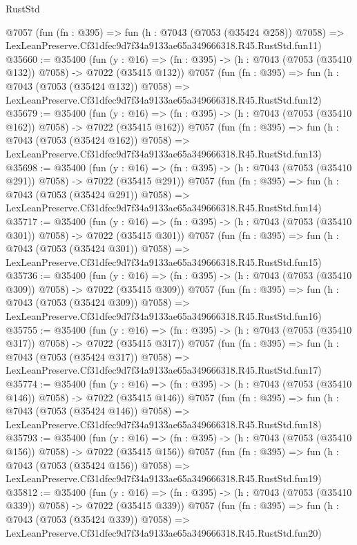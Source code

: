 \begin{lexlean}{RustStd}
\begin{coremodule}
    @7057
    (fun (fn : @395) =>
    fun (h : @7043 (@7053 (@35424 @258)) @7058) =>
    LexLeanPreserve.Cf31dfec9d7f34a9133ae65a349666318.R45.RustStd.fun11)
@35660 := @35400
    (fun (y : @16) => (fn : @395) -> (h : @7043 (@7053 (@35410 @132)) @7058) -> @7022 (@35415 @132))
    @7057
    (fun (fn : @395) =>
    fun (h : @7043 (@7053 (@35424 @132)) @7058) =>
    LexLeanPreserve.Cf31dfec9d7f34a9133ae65a349666318.R45.RustStd.fun12)
@35679 := @35400
    (fun (y : @16) => (fn : @395) -> (h : @7043 (@7053 (@35410 @162)) @7058) -> @7022 (@35415 @162))
    @7057
    (fun (fn : @395) =>
    fun (h : @7043 (@7053 (@35424 @162)) @7058) =>
    LexLeanPreserve.Cf31dfec9d7f34a9133ae65a349666318.R45.RustStd.fun13)
@35698 := @35400
    (fun (y : @16) => (fn : @395) -> (h : @7043 (@7053 (@35410 @291)) @7058) -> @7022 (@35415 @291))
    @7057
    (fun (fn : @395) =>
    fun (h : @7043 (@7053 (@35424 @291)) @7058) =>
    LexLeanPreserve.Cf31dfec9d7f34a9133ae65a349666318.R45.RustStd.fun14)
@35717 := @35400
    (fun (y : @16) => (fn : @395) -> (h : @7043 (@7053 (@35410 @301)) @7058) -> @7022 (@35415 @301))
    @7057
    (fun (fn : @395) =>
    fun (h : @7043 (@7053 (@35424 @301)) @7058) =>
    LexLeanPreserve.Cf31dfec9d7f34a9133ae65a349666318.R45.RustStd.fun15)
@35736 := @35400
    (fun (y : @16) => (fn : @395) -> (h : @7043 (@7053 (@35410 @309)) @7058) -> @7022 (@35415 @309))
    @7057
    (fun (fn : @395) =>
    fun (h : @7043 (@7053 (@35424 @309)) @7058) =>
    LexLeanPreserve.Cf31dfec9d7f34a9133ae65a349666318.R45.RustStd.fun16)
@35755 := @35400
    (fun (y : @16) => (fn : @395) -> (h : @7043 (@7053 (@35410 @317)) @7058) -> @7022 (@35415 @317))
    @7057
    (fun (fn : @395) =>
    fun (h : @7043 (@7053 (@35424 @317)) @7058) =>
    LexLeanPreserve.Cf31dfec9d7f34a9133ae65a349666318.R45.RustStd.fun17)
@35774 := @35400
    (fun (y : @16) => (fn : @395) -> (h : @7043 (@7053 (@35410 @146)) @7058) -> @7022 (@35415 @146))
    @7057
    (fun (fn : @395) =>
    fun (h : @7043 (@7053 (@35424 @146)) @7058) =>
    LexLeanPreserve.Cf31dfec9d7f34a9133ae65a349666318.R45.RustStd.fun18)
@35793 := @35400
    (fun (y : @16) => (fn : @395) -> (h : @7043 (@7053 (@35410 @156)) @7058) -> @7022 (@35415 @156))
    @7057
    (fun (fn : @395) =>
    fun (h : @7043 (@7053 (@35424 @156)) @7058) =>
    LexLeanPreserve.Cf31dfec9d7f34a9133ae65a349666318.R45.RustStd.fun19)
@35812 := @35400
    (fun (y : @16) => (fn : @395) -> (h : @7043 (@7053 (@35410 @339)) @7058) -> @7022 (@35415 @339))
    @7057
    (fun (fn : @395) =>
    fun (h : @7043 (@7053 (@35424 @339)) @7058) =>
    LexLeanPreserve.Cf31dfec9d7f34a9133ae65a349666318.R45.RustStd.fun20)

\end{coremodule}
\end{lexlean}
